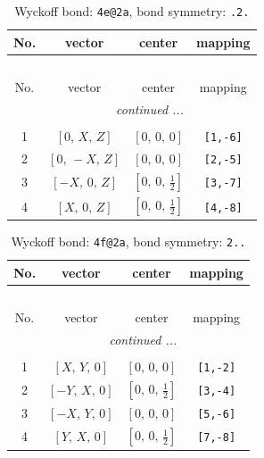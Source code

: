 \documentclass[fleqn,8pt]{jsarticle}
\begin{document}
\renewcommand{\arraystretch}{1.2}
\begin{longtable}{cccc}
\caption{Wyckoff bond: {\tt 4e@2a}, bond symmetry: {\tt .2.}}
 \\
 \hline \hline
No. & vector & center & mapping \\ \hline \endfirsthead

\multicolumn{3}{l}{\tablename\ \thetable{}} \\
 \hline \hline
No. & vector & center & mapping \\ \hline \endhead

 \hline \hline
\multicolumn{3}{r}{\footnotesize\it continued ...} \\ \endfoot

 \hline \hline
\multicolumn{3}{r}{} \\ \endlastfoot

1 & $\left[ 0,\, X,\, Z \right]$ & $\left[ 0,\, 0,\, 0 \right]$ & {\tt [1,-6]} \\ \hline
2 & $\left[ 0,\, - X,\, Z \right]$ & $\left[ 0,\, 0,\, 0 \right]$ & {\tt [2,-5]} \\ \hline
3 & $\left[ - X,\, 0,\, Z \right]$ & $\left[ 0,\, 0,\, \frac{1}{2} \right]$ & {\tt [3,-7]} \\ \hline
4 & $\left[ X,\, 0,\, Z \right]$ & $\left[ 0,\, 0,\, \frac{1}{2} \right]$ & {\tt [4,-8]} \\
\end{longtable}
\renewcommand{\arraystretch}{1.2}
\begin{longtable}{cccc}
\caption{Wyckoff bond: {\tt 4f@2a}, bond symmetry: {\tt 2..}}
 \\
 \hline \hline
No. & vector & center & mapping \\ \hline \endfirsthead

\multicolumn{3}{l}{\tablename\ \thetable{}} \\
 \hline \hline
No. & vector & center & mapping \\ \hline \endhead

 \hline \hline
\multicolumn{3}{r}{\footnotesize\it continued ...} \\ \endfoot

 \hline \hline
\multicolumn{3}{r}{} \\ \endlastfoot

1 & $\left[ X,\, Y,\, 0 \right]$ & $\left[ 0,\, 0,\, 0 \right]$ & {\tt [1,-2]} \\ \hline
2 & $\left[ - Y,\, X,\, 0 \right]$ & $\left[ 0,\, 0,\, \frac{1}{2} \right]$ & {\tt [3,-4]} \\ \hline
3 & $\left[ - X,\, Y,\, 0 \right]$ & $\left[ 0,\, 0,\, 0 \right]$ & {\tt [5,-6]} \\ \hline
4 & $\left[ Y,\, X,\, 0 \right]$ & $\left[ 0,\, 0,\, \frac{1}{2} \right]$ & {\tt [7,-8]} \\
\end{longtable}
\end{document}
